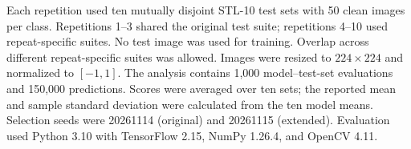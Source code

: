 Each repetition used ten mutually disjoint STL-10 test sets with 50 clean
images per class. Repetitions 1--3 shared the original test suite;
repetitions 4--10 used repeat-specific suites. No test image was used for
training. Overlap across different repeat-specific suites was allowed. Images
were resized to $224\times224$ and normalized to $[-1,1]$. The analysis contains
1,000 model--test-set evaluations and 150,000 predictions. Scores were averaged
over ten sets; the reported mean and sample standard deviation were calculated
from the ten model means. Selection seeds were
20261114 (original) and 20261115 (extended). Evaluation used Python 3.10 with
TensorFlow 2.15, NumPy 1.26.4, and OpenCV 4.11.
